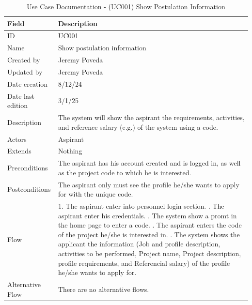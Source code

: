 \documentclass{scrreprt}
\begin{document}
\begin{table}[H]
	\centering \small
	\begin{tabular}{|p{3cm}|p{10cm}|}
		\hline
		\textbf{Field} & \textbf{Description} \\ \hline
		ID & UC001 \\ \hline
		Name &  Show postulation information \\ \hline
		Created by & Jeremy Poveda \\ \hline
		Updated by & Jeremy Poveda \\ \hline
		Date creation & 8/12/24 \\ \hline
		Date last edition & 3/1/25 \\ \hline
		Description &  The system will show the aspirant the requirements, activities, and reference salary (e.g.) of the system using a code. \\ \hline
		Actors &  Aspirant \\ \hline
		Extends & Nothing \\ \hline
		Preconditions & The aspirant has his account created and is logged in, as well as the project code to which he is interested. \\ \hline
		Postconditions & The aspirant only must see the profile he/she wants to apply for with the unique code. \\ \hline
		Flow & 
		1. The aspirant enter into personnel login section. \newline
		2. The aspirant enter his credentials. \newline
		3. The system show a promt in the home page to enter a code. \newline
		4. The aspirant enters the code of the project he/she is interested in. \newline
		5. The system shows the applicant the information (Job and profile description, activities to be performed, Project name, Project description, profile requirements, and Referencial salary) of the profile he/she wants to apply for. 
		\\ \hline
		Alternative Flow &  There are no alternative flows. \\ \hline
	\end{tabular}
	\caption{Use Case Documentation - (UC001) Show Postulation Information}
	\label{table:UC001}
\end{table}
\end{document}
